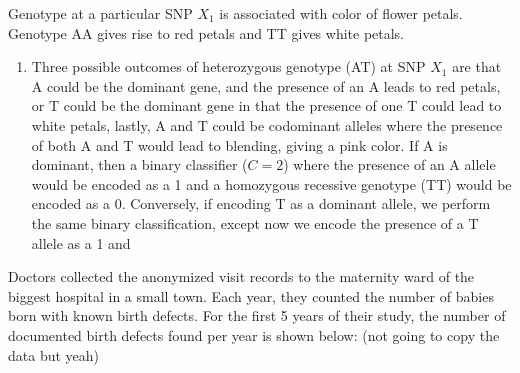 \documentclass[12pt]{article}
\newenvironment{problem}[2][Problem]{\begin{trivlist}
\item[\hskip \labelsep {\bfseries #1}\hskip \labelsep {\bfseries #2.}]}{\end{trivlist}}
\begin{document}
\newpage

\begin{problem}{2}
Genotype at a particular SNP $X_{1}$ is associated with color of flower petals. Genotype AA gives rise to red petals and TT gives white petals.
\end{problem}

\begin{enumerate}
\item Three possible outcomes of heterozygous genotype (AT) at SNP $X_{1}$ are that A could be the dominant gene, and the presence of an A leads to red petals, or T could be the dominant gene in that the presence of one T could lead to white petals, lastly, A and T could be codominant alleles where the presence of both A and T would lead to blending, giving a pink color. If A is dominant, then a binary classifier ($C = 2$) where the presence of an A allele would be encoded as a 1 and a homozygous recessive genotype (TT) would be encoded as a 0. Conversely, if encoding T as a dominant allele, we perform the same binary classification, except now we encode the presence of a T allele as a 1 and 
\end{enumerate}

\newpage

\begin{problem}{3}
Doctors collected the anonymized visit records to the maternity ward of the biggest hospital in a small town. Each year, they counted the number of babies born with known birth defects. For the first 5 years of their study, the number of documented birth defects found per year is shown below: (not going to copy the data but yeah)
\end{problem}
\end{document}
